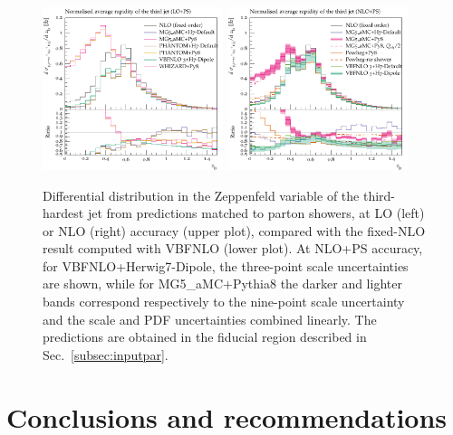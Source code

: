 \documentclass[twocolumn,epjc3]{svjour3} %
\newlength{\width}
\begin{document}
\begin{figure}
\centering
\includegraphics[width=0.47\textwidth]{figures/LOPS/z_j3.pdf}
\includegraphics[width=0.47\textwidth]{figures/NLOPS/z_j3.pdf}
\caption{Differential distribution in the
Zeppenfeld variable of the third-hardest jet
from predictions matched to parton showers, at LO (left) or NLO (right) accuracy (upper plot), compared with the fixed-NLO result computed with {\sc VBFNLO} (lower plot). At NLO+PS accuracy, for
    {\sc VBFNLO}+{\sc Herwig7-Dipole}, the three-point scale uncertainties are shown, while for {\sc MG5\_aMC}+{\sc Pythia8} the darker and lighter bands correspond
    respectively to the nine-point scale uncertainty and the scale and PDF uncertainties combined linearly.
    The predictions are obtained in the fiducial region described in Sec.~\protect\ref{subsec:inputpar}.}
\label{fig:PSz3}
\end{figure}


\section{Conclusions and recommendations}
\label{sec:conclusion}
\end{document}
